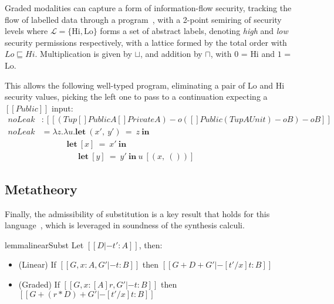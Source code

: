 \begin{example}%
\label{exm:security}
%
Graded modalities can capture a form of information-flow security, tracking the
flow of labelled data through a
program~\citep{DBLP:journals/pacmpl/OrchardLE19}, with a 2-point semiring of
security levels where $\mathcal{L} = \{ \text{Hi}, \text{Lo} \}$ forms a set of
abstract labels, denoting \emph{high} and \emph{low} security permissions
respectively, with a lattice formed by the total order with $Lo \sqsubseteq Hi$.
Multiplication is given by $\sqcup$, and addition by $\sqcap$, with $0$ = $\text{Hi}$
and $1$ = $\text{Lo}$. 

This allows the following well-typed program, eliminating a pair of $\text{Lo}$
and $\text{Hi}$ security values, picking the left one to pass to a continuation
expecting a $[[ Public ]]$ input:
%
\begin{align*}
\textit{noLeak} & : [[ (Tup {[] Public A} {[] Private A}) -o {({[]
                  Public (Tup A Unit)} -o B) -o B} ]] \\
\textit{noLeak} & = \lambda z . \lambda u . \textbf{let}\ (x',\ y')\ =\ z\ \textbf{in}\ \\
                & \;\;\;\;\;\;\;\;\;\;\; \textbf{let}\ [x]\ =\ x'\ \textbf{in}\ \\ 
                & \;\;\;\;\;\;\;\;\;\;\;\;\;\;\;\; \textbf{let}\ [y]\ =\ y'\ \textbf{in}\ u\ [(x,\ ())]
\end{align*}
\end{example}

\subsection{Metatheory}
Finally, the admissibility of substitution is a key result that holds
for this language~\citep{DBLP:journals/pacmpl/OrchardLE19}, which is
leveraged in soundness of the synthesis calculi.
%
\begin{restatable}{lemma}{linearSubst}
Let $[[ D |- t' : A]]$, then:
\label{lemma:substitution}
\begin{itemize}[leftmargin=1em]
\item (Linear) \hspace{0.04em} If $[[ {G, x : A}
    , { G' } |- t : B]]$ then $[[ G + D + G' |-
[ t' / x ] t : B ]]$
\item (Graded) If $[[ {G, x : [A] r} , { G' } |- t : B]]$
then $[[ G + (r * D) + G' |- [ t' / x ] t : B ]]$
\end{itemize}
\end{restatable}


